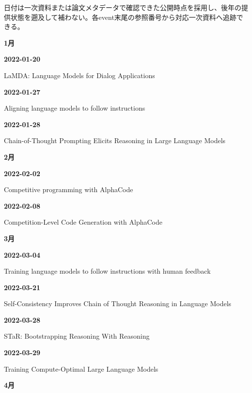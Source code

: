 \noindent 日付は一次資料または論文メタデータで確認できた公開時点を採用し、後年の提供状態を遡及して補わない。各event末尾の参照番号から対応一次資料へ追跡できる。
\par\medskip
\medskip
\noindent\textbf{1月}\par
\smallskip
\noindent\textbf{2022-01-20}\par
{\raggedright LaMDA: Language Models for Dialog Applications\,\cite{src-2a9e3cfb3148}\par}
\smallskip
\noindent\textbf{2022-01-27}\par
{\raggedright Aligning language models to follow instructions\,\cite{src-87477ad8b476}\par}
\smallskip
\noindent\textbf{2022-01-28}\par
{\raggedright Chain-of-Thought Prompting Elicits Reasoning in Large Language Models\,\cite{src-a17359c66f6b}\par}
\smallskip
\medskip
\noindent\textbf{2月}\par
\smallskip
\noindent\textbf{2022-02-02}\par
{\raggedright Competitive programming with AlphaCode\,\cite{src-dc0d76e03fc6}\par}
\smallskip
\noindent\textbf{2022-02-08}\par
{\raggedright Competition-Level Code Generation with AlphaCode\,\cite{src-8170b5e4c279}\par}
\smallskip
\medskip
\noindent\textbf{3月}\par
\smallskip
\noindent\textbf{2022-03-04}\par
{\raggedright Training language models to follow instructions with human feedback\,\cite{src-e58f1e9c8754}\par}
\smallskip
\noindent\textbf{2022-03-21}\par
{\raggedright Self-Consistency Improves Chain of Thought Reasoning in Language Models\,\cite{chron-025c167e829d}\par}
\smallskip
\noindent\textbf{2022-03-28}\par
{\raggedright STaR: Bootstrapping Reasoning With Reasoning\,\cite{chron-b69d75cbaca7}\par}
\smallskip
\noindent\textbf{2022-03-29}\par
{\raggedright Training Compute-Optimal Large Language Models\,\cite{src-6ffa5c4e64ca}\par}
\smallskip
\medskip
\noindent\textbf{4月}\par
